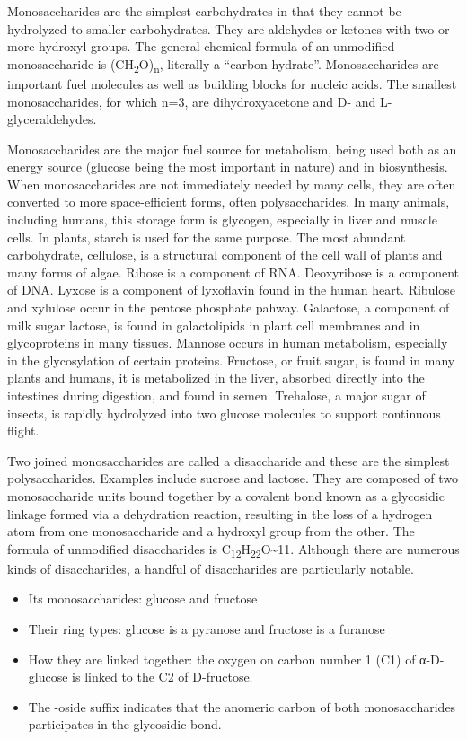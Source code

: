 Monosaccharides are the simplest carbohydrates in that they cannot be
hydrolyzed to smaller carbohydrates. They are aldehydes or ketones with
two or more hydroxyl groups. The general chemical formula of an
unmodified monosaccharide is (CH\textsubscript{2}O)\textsubscript{n},
literally a ``carbon hydrate''. Monosaccharides are important fuel
molecules as well as building blocks for nucleic acids. The smallest
monosaccharides, for which n=3, are dihydroxyacetone and D- and
L-glyceraldehydes.

Monosaccharides are the major fuel source for metabolism, being used
both as an energy source (glucose being the most important in nature)
and in biosynthesis. When monosaccharides are not immediately needed by
many cells, they are often converted to more space-efficient forms,
often polysaccharides. In many animals, including humans, this storage
form is glycogen, especially in liver and muscle cells. In plants,
starch is used for the same purpose. The most abundant carbohydrate,
cellulose, is a structural component of the cell wall of plants and many
forms of algae. Ribose is a component of RNA. Deoxyribose is a component
of DNA. Lyxose is a component of lyxoflavin found in the human heart.
Ribulose and xylulose occur in the pentose phosphate pahway. Galactose,
a component of milk sugar lactose, is found in galactolipids in plant
cell membranes and in glycoproteins in many tissues. Mannose occurs in
human metabolism, especially in the glycosylation of certain proteins.
Fructose, or fruit sugar, is found in many plants and humans, it is
metabolized in the liver, absorbed directly into the intestines during
digestion, and found in semen. Trehalose, a major sugar of insects, is
rapidly hydrolyzed into two glucose molecules to support continuous
flight.

Two joined monosaccharides are called a disaccharide and these are the
simplest polysaccharides. Examples include sucrose and lactose. They are
composed of two monosaccharide units bound together by a covalent bond
known as a glycosidic linkage formed via a dehydration reaction,
resulting in the loss of a hydrogen atom from one monosaccharide and a
hydroxyl group from the other. The formula of unmodified disaccharides
is C\textsubscript{12}H\textsubscript{22}O\textasciitilde11. Although
there are numerous kinds of disaccharides, a handful of disaccharides
are particularly notable.

\begin{itemize}
\tightlist
\item
  Its monosaccharides: glucose and fructose
\item
  Their ring types: glucose is a pyranose and fructose is a furanose
\item
  How they are linked together: the oxygen on carbon number 1 (C1) of
  α-D-glucose is linked to the C2 of D-fructose.
\item
  The -oside suffix indicates that the anomeric carbon of both
  monosaccharides participates in the glycosidic bond.
\end{itemize}

